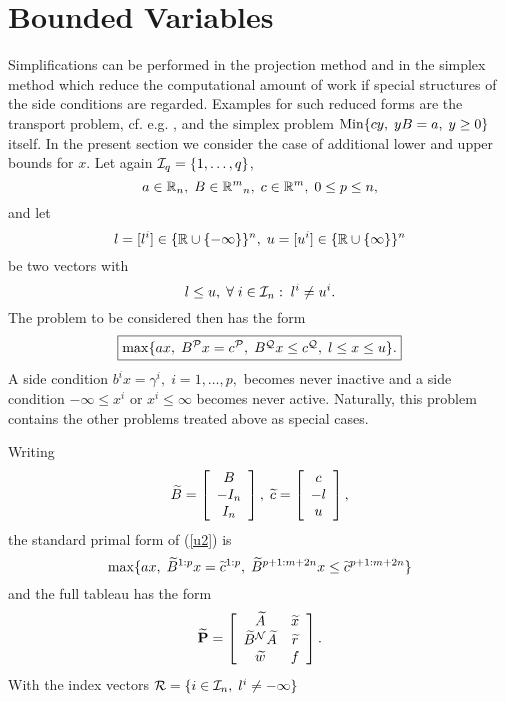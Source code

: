 \section{Bounded Variables}
Simplifications can be performed in the projection method and in the simplex
method which reduce the computational amount of work if special structures of
the side conditions are regarded.  Examples for such reduced forms are the
transport problem, cf.  e.g.  \cite{ColWe}, and the simplex problem $\Min \{
cy, \; yB = a, \; y \geq 0 \}$ itself.  In the present section we consider the
case of additional lower and upper bounds for $x$.  Let again $\I_q = \{1,
\ldots, q\}$,
\[
a \in \Bbb{R}_n, \; B \in \Bbb{R}^m{}_n, \; c \in \Bbb{R}^m, \; 0 \leq p \leq
n,
\]
and let
\[
l = [l^i] \in \{\Bbb{R} \cup \{- \infty\}\}^n, \;
u = [u^i] \in \{\Bbb{R} \cup \{\infty\}\}^n
\]
be two vectors with
%
\begin{equation} \label{u1}
l \leq u, \; \forall \; i \in \I_n: \; l^i \neq u^i.
\end{equation}
The problem to be considered then has the form
%
\begin{equation} \label{u2}
\fbox{$
\max \{ ax, \; B^{\P}x = c^{\P}, \; B^{\Q}x \leq c^{\Q}, \; l \leq
x \leq u \}.
$}
\end{equation}
A side condition $b^ix = \gamma ^i, \; i = 1, \ldots, p,$ becomes never
inactive and a side condition $- \infty \leq x^i$ or $x^i \leq \infty$ becomes
never active. Naturally, this problem  contains the other problems treated
above as special cases.
\par
Writing
\[
\wi{B} = \ba{[}{c} B \\ - I_n \\ I_n \ea{]}, \;
\wi{c} = \ba{[}{c} c \\ -l    \\ u \ea{]},
\]
the standard primal form of (\ref{u2}) is
%
\begin{equation} \label{u3}
\max \{ ax, \; \wi{B}^{1:p}x = \wi{c}^{1:p}, \; \wi{B}^{p+1:m+2n}x
\leq \wi{c}^{p+1:m+2n} \}
\end{equation}
and the full tableau has the form
%
\begin{equation} \label{u4}
\wi{{\bf P}} = \ba{[}{cc}  \wi{A}           & \wi{x}\\
                          \wi{B}^{\N}\wi{A} & \wi{r}\\
                          \wi{w}            & f
               \ea{]}.
\end{equation}
With the index vectors $\R = \{i \in \I_n, \; l^i \neq - \infty\}$
